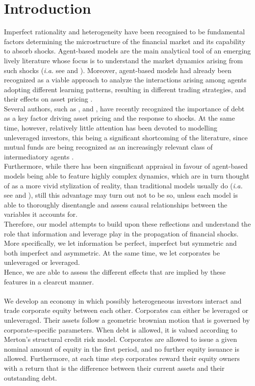 \documentclass[11pt]{article}
\begin{document}
\section*{Introduction}\label{Introduction}
Imperfect rationality and heterogeneity have been recognised to be fundamental factors determining the microstructure of the financial market and its capability to absorb shocks. Agent-based models are the main analytical tool of an emerging lively literature whose focus is to understand the market dynamics arising from such shocks (\emph{i.a.} see \citet{7} and \citet{8}). Moreover, agent-based models had already been recognized as a viable approach to analyze the interactions arising among agents adopting different learning patterns, resulting in different trading strategies, and their effects on asset pricing \citep{9}.\\
Several authors, such as \citet{10}, \citet{11} and \citet{3}, have recently recognized the importance of debt as a key factor driving asset pricing and the response to shocks. At the same time, however, relatively little attention has been devoted to modelling unleveraged investors, this being a significant shortcoming of the literature, since mutual funds are being recognized as an increasingly relevant class of intermediatory agents \citep{12}.\\
Furthermore, while there has been singnificant appraisal in favour of agent-based models being able to feature highly complex dynamics, which are in turn thought of as a more vivid stylization of reality, than traditional models usually do (\emph{i.a.} see \citet{13} and \citet{14}), still this advantage may turn out not to be so, unless each model is able to thoroughly disentangle and assess causal relationships between the variables it accounts for.\\
Therefore, our model attempts to build upon these reflections and understand the role that information and leverage play in the propagation of financial shocks. More specifically, we let information be perfect, imperfect but symmetric and both imperfect and asymmetric. At the same time, we let corporates be unleveraged or leveraged.\\ Hence, we are able to assess the different effects that are implied by these features in a clearcut manner.
\\\\
We develop an economy in which possibly heterogeneous investors interact and trade corporate equity between each other. Corporates can either be leveraged or unleveraged. Their assets follow a geometric brownian motion that is governed by corporate-specific parameters. When debt is allowed, it is valued according to Merton's structural credit risk model. Corporates are allowed to issue a given nominal amount of equity in the first period, and no further equity issuance is allowed. Furthermore, at each time step corporates reward their equity owners with a return that is the difference between their current assets and their outstanding debt.\\
\end{document}
